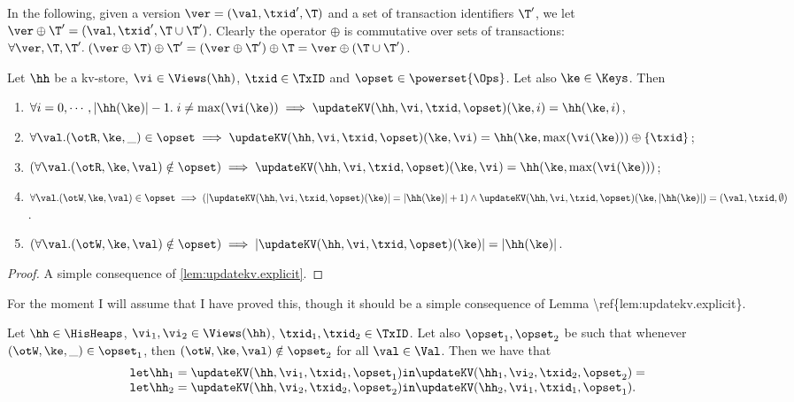 In the following, given a version $\ver = (\val, \txid', \T)$ and a set of 
transaction identifiers $\T'$, we let $\ver \oplus \T' = (\val, \txid', \T \cup \T')$. 
Clearly the operator $\oplus$ is commutative over sets of transactions: 
$\forall \ver, \T, \T'.\; (\ver \oplus \T) \oplus \T' = (\ver \oplus \T') \oplus \T = 
\ver \oplus (\T \cup \T')$.

\begin{corollary}
\label{cor:updatekv.singlecell}
Let $\hh$ be a kv-store, $\vi \in \Views(\hh)$, $\txid \in \TxID$ and $\opset \in \powerset{\Ops}$. 
Let also $\ke \in \Keys$. Then 
\begin{enumerate}
\item\label{item:updatekv.singlecell.noview} $\forall i=0,\cdots, \lvert \hh(\ke) \rvert -1.\; i \neq \max(\vi(\ke)) \implies \updateKV(\hh, \vi, \txid, \opset)(\ke, i) = 
\hh(\ke, i)$, 
\item\label{item:updatekv.singlecell.rd} $\forall \val. (\otR, \ke, \_) \in \opset \implies \updateKV(\hh,\vi,\txid, \opset)(\ke, \vi) = \hh(\ke, \max(\vi(\ke))) \oplus \{\txid\}$; 
\item\label{item:updatekv.singlecell.nord} $(\forall \val.(\otR,\ke, \val) \notin \opset) \implies \updateKV(\hh,\vi,\txid, \opset)(\ke,\vi) = \hh(\ke, \max(\vi(\ke)))$;
\item\label{item:updatekv.singlecell.wr} $\forall \val.(\otW, \ke, \val) \in \opset \implies (\lvert \updateKV(\hh,\vi,\txid,\opset)(\ke) \rvert = 
\lvert \hh(\ke) \rvert + 1) \wedge \updateKV(\hh,\vi,\txid,\opset)(\ke, \lvert \hh(\ke) \rvert) = (\val, \txid, \emptyset)$.
\item\label{item:updatekv.singlecell.nowr} $(\forall \val.(\otW, \ke, \val) \notin \opset) \implies \lvert \updateKV(\hh,\vi,\txid,\opset)(\ke) \rvert = \lvert \hh(\ke) \rvert$.
\end{enumerate}
\end{corollary}

\begin{proof}
A simple consequence of \cref{lem:updatekv.explicit}.
\end{proof}
\ac{For the moment I will assume that I have proved this, though it should be a simple consequence of Lemma 
\ref{lem:updatekv.explicit}.}

\begin{proposition}
Let $\hh \in \HisHeaps$, $\vi_1, \vi_2 \in \Views(\hh)$, 
$\txid_1, \txid_2 \in \TxID$. 
Let also $\opset_1, \opset_2$ be such that whenever 
$(\otW, \ke, \_) \in \opset_1$, then $(\otW, \ke, \val) \notin \opset_2$ 
for all $\val \in \Val$. Then we have that
\[
\begin{array}{l}
\mathtt{let } \hh_1 = \updateKV(\hh, \vi_1, \txid_1, \opset_1) \mathtt{ in } \updateKV(\hh_1, \vi_2, \txid_2, \opset_2) = \\
\mathtt{let } \hh_2 = \updateKV(\hh, \vi_2, \txid_2, \opset_2) \mathtt{ in } \updateKV(\hh_2, \vi_1, \txid_1, \opset_1).
\end{array}
\]
\end{proposition}

